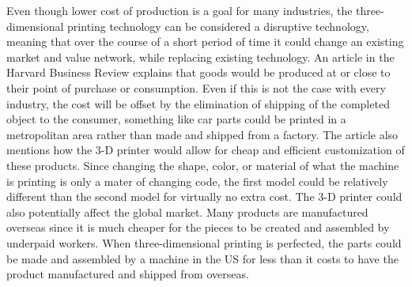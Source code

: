 \documentclass[pdftex,10.5pt]{report}
\begin{document}
 Even though lower cost of production is a goal for many industries, the three-dimensional printing technology can be considered a disruptive technology, meaning that over the course of a short period of time it could change an existing market and value network, while replacing existing technology. An article in the Harvard Business Review explains that goods would be produced at or close to their point of purchase or consumption. Even if this is not the case with every industry, the cost will be offset by the elimination of shipping of the completed object to the consumer, something like car parts could be printed in a metropolitan area rather than made and shipped from a factory. The article also mentions how the 3-D printer would allow for cheap and efficient customization of these products. Since changing the shape, color, or material of what the machine is printing is only a mater of changing code, the first model could be relatively different than the second model for virtually no extra cost. \cite{cite6} The 3-D printer could also potentially affect the global market. Many products are manufactured overseas since it is much cheaper for the pieces to be created and assembled by underpaid workers. When three-dimensional printing is perfected, the parts could be made and assembled by a machine in the US for less than it costs to have the product manufactured and shipped from overseas. 
\end{document}
